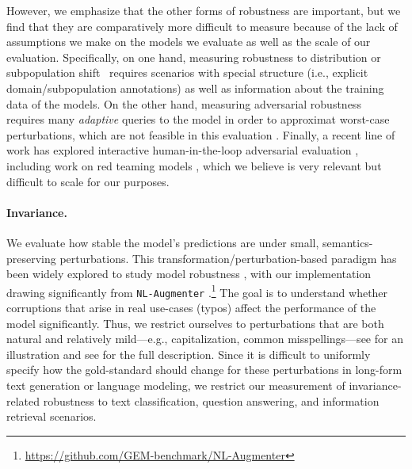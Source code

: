 However, we emphasize that the other forms of robustness are important, but we find that they are comparatively more  difficult to measure because of the lack of assumptions we make on the models we evaluate as well as the scale of our evaluation.
Specifically, on one hand, measuring robustness to distribution or subpopulation shift~\citep{oren2019drolm, santurkar2020breeds, goel2020model, koh2021wilds} requires scenarios with special structure (i.e., explicit domain/subpopulation annotations) as well as information about the training data of the models.
On the other hand, measuring adversarial robustness~\citep{biggio2013evasion,szegedy2014intriguing} requires many \emph{adaptive} queries to the model in order to approximat worst-case perturbations, which are not feasible in this evaluation \citep{wallace2019universal, morris2020textattack}. 
Finally, a recent line of work has explored interactive human-in-the-loop adversarial evaluation \citep{wallace2019trick, nie2020adversarial, bartolo2020beat, kiela2021dynabench}, including work on red teaming models \citep{perez2022red, ganguli2022red}, which we believe is very relevant but difficult to scale for our purposes. 

\paragraph{Invariance.} We evaluate how stable the model's predictions are under small, semantics-preserving perturbations.
This transformation/perturbation-based paradigm has been widely explored to study model robustness \citep[\eg][]{ribeiro2020beyond, goel2021robustness, wang2021textflint}, with our implementation drawing significantly from \texttt{NL-Augmenter} \citep{dhole2021nl}.\footnote{\url{https://github.com/GEM-benchmark/NL-Augmenter}} 
The goal is to understand whether corruptions that arise in real use-cases (\eg typos) affect the performance of the model significantly.
Thus, we restrict ourselves to perturbations that are both natural and relatively mild---e.g., capitalization, common misspellings---see  for an illustration and see  for the full description.
Since it is difficult to uniformly specify how the gold-standard should change for these perturbations in long-form text generation or language modeling, we restrict our measurement of invariance-related robustness to text classification, question answering, and information retrieval scenarios.

